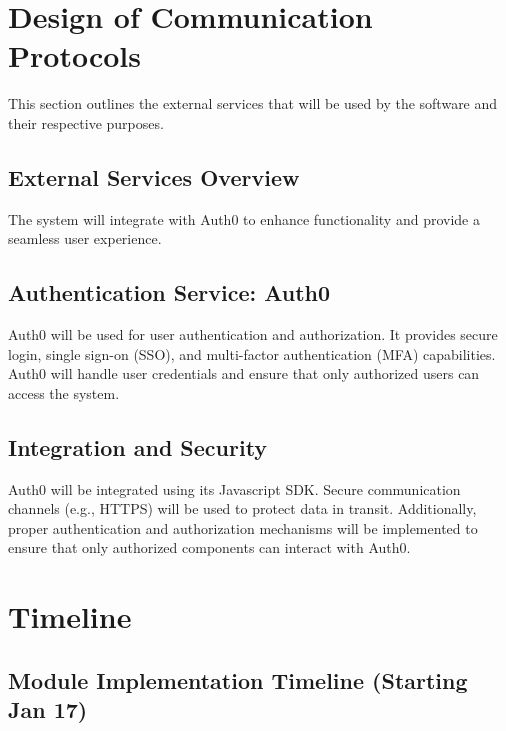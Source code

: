 \documentclass[12pt, titlepage]{article}
\begin{document}
\section{Design of Communication Protocols}

This section outlines the external services that will be used by the software and their respective purposes.

\subsection{External Services Overview}
The system will integrate with Auth0 to enhance functionality and provide a seamless user experience.

\subsection{Authentication Service: Auth0}
Auth0 will be used for user authentication and authorization. It provides secure login, single sign-on (SSO), and multi-factor authentication (MFA) capabilities. Auth0 will handle user credentials and ensure that only authorized users can access the system.

\subsection{Integration and Security}
Auth0 will be integrated using its Javascript SDK. Secure communication channels (e.g., HTTPS) will be used to protect data in transit. Additionally, proper authentication and authorization mechanisms will be implemented to ensure that only authorized components can interact with Auth0.

\section{Timeline}


\subsection{Module Implementation Timeline (Starting Jan 17)}
\end{document}
